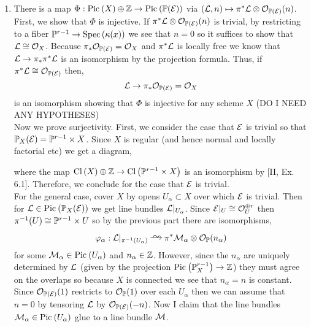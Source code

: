 \documentclass[12pt]{article}
\begin{document}
\begin{enumerate}
\item There is a map $\Phi : \Pic{X} \oplus \Z \to \Pic{\P(\E)}$ via $(\L, n) \mapsto \pi^* \L \otimes \struct{\P(\E)}(n)$. First, we show that $\Phi$ is injective. If $\pi^* \L \otimes \struct{\P(\E)}(n)$ is trivial, by restricting to a fiber $\P^{r-1} \to \Spec{\kappa(x)}$ we see that $n = 0$ so it suffices to show that $\L \cong \struct{X}$. Because $\pi_* \struct{\P(\E)} = \struct{X}$ and $\pi^* \L$ is locally free we know that $\L \to \pi_* \pi^* \L$ is an isomorphism by the projection formula. Thus, if $\pi^* \L \cong \struct{\P(\E)}$ then,
\[ \L \to \pi_* \struct{\P(\E)} = \struct{X} \]
is an isomorphism showing that $\Phi$ is injective for any scheme $X$ (DO I NEED ANY HYPOTHESES)
\bigskip\\
Now we prove surjectivity. First, we consider the case that $\E$ is trivial so that $\P_X(\E) = \P^{r-1} \times X$. Since $X$ is regular (and hence normal and locally factorial etc) we get a diagram,
\begin{center}
\end{center}
where the map $\Cl{X} \oplus \Z \to \Cl{\P^{r-1} \times X}$ is an isomorphism by [II, Ex. 6.1]. Therefore, we conclude for the case that $\E$ is trivial.
\bigskip\\
For the general case, cover $X$ by opens $U_\alpha \subset X$ over which $\E$ is trivial. Then for $\L \in \Pic{\P_X(\E)}$ we get line bundles $\L|_{U_\alpha}$. Since $\E|_U \cong \struct{U}^{\oplus r}$ then $\pi^{-1}(U) \cong \P^{r-1} \times U$ so by the previous part there are isomorphisms,
\[ \varphi_\alpha : \L|_{\pi^{-1}(U_\alpha)} \iso \pi^* \M_\alpha \ot \struct{\P}(n_\alpha) \]
for some $\M_\alpha \in \Pic{U_\alpha}$ and $n_\alpha \in \Z$. However, since the $n_\alpha$ are uniquely determined by $\L$ (given by the projection $\Pic{\P^{r-1}_X} \to \Z$) they must agree on the overlaps so because $X$ is connected we see that $n_\alpha = n$ is constant. Since $\struct{\P(\E)}(1)$ restricts to $\struct{\P}(1)$ over each $U_\alpha$ then we can assume that $n = 0$ by tensoring $\L$ by $\struct{\P(\E)}(-n)$. Now I claim that the line bundles $\M_\alpha \in \Pic{U_\alpha}$ glue to a line bundle $\M$. 
\bigskip\\

\end{enumerate}
\end{document}

